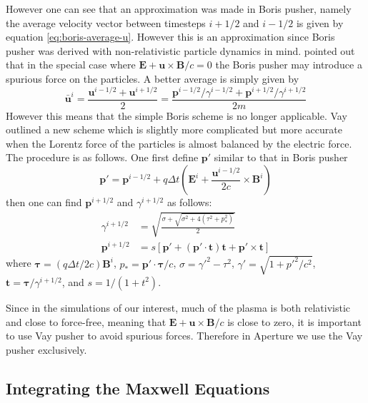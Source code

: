 However one can see that an approximation was made in Boris pusher, namely the
average velocity vector between timesteps $i+1/2$ and $i-1/2$ is given by
equation \eqref{eq:boris-average-u}. However this is an approximation since
Boris pusher was derived with non-relativistic particle dynamics in mind.
\citet{vay_simulation_2008} pointed out that in the special case where
$\mathbf{E} + \mathbf{u}\times \mathbf{B}/c = 0$ the Boris pusher may introduce a
spurious force on the particles. A better average is simply given by
\begin{equation}
  \label{eq:vay-average-u}
  \bar{\mathbf{u}}^i = \frac{\mathbf{u}^{i-1/2} + \mathbf{u}^{i+1/2}}{2} = \frac{\mathbf{p}^{i-1/2}/\gamma^{i-1/2} + \mathbf{p}^{i+1/2}/\gamma^{i+1/2}}{2m}
\end{equation}
However this means that the simple Boris scheme is no longer applicable. Vay
outlined a new scheme which is slightly more complicated but more accurate when
the Lorentz force of the particles is almost balanced by the electric force. The
procedure is as follows. One first define $\mathbf{p}'$ similar to that in Boris
pusher
\begin{equation}
  \label{eq:vay-p-prime}
  \mathbf{p}' = \mathbf{p}^{i-1/2} + q\Delta t\left( \mathbf{E}^i + \frac{\mathbf{u}^{i-1/2}}{2c}\times \mathbf{B}^i \right)
\end{equation}
then one can find $\mathbf{p}^{i+1/2}$ and $\gamma^{i+1/2}$ as follows:
\begin{align}
  \label{eq:vay-solution}
  \gamma^{i+1/2} &= \sqrt{\frac{\sigma + \sqrt{\sigma^2 + 4(\tau^2 + p_{*}^2)}}{2}} \\
  \mathbf{p}^{i+1/2} &= s \left[ \mathbf{p}' + (\mathbf{p}'\cdot \mathbf{t})\mathbf{t} + \mathbf{p}'\times \mathbf{t} \right]
\end{align}
where $\bm{\tau} = (q\Delta t/2c)\mathbf{B}^i$, $p_{*}=\mathbf{p}'\cdot\bm{\tau}/c$,
$\sigma = \gamma'^2-\tau^2$, $\gamma' = \sqrt{1 + p'^2/c^2}$, $\mathbf{t} =
\bm{\tau}/\gamma^{i+1/2}$, and $s = 1/(1 + t^2)$.

Since in the simulations of our interest, much of the plasma is both
relativistic and close to force-free, meaning that $\mathbf{E} +
\mathbf{u}\times \mathbf{B}/c$ is close to zero, it is important to use Vay
pusher to avoid spurious forces. Therefore in Aperture we use the Vay pusher
exclusively.

\subsection{Integrating the Maxwell Equations}
\label{sec:fd-maxwell}

